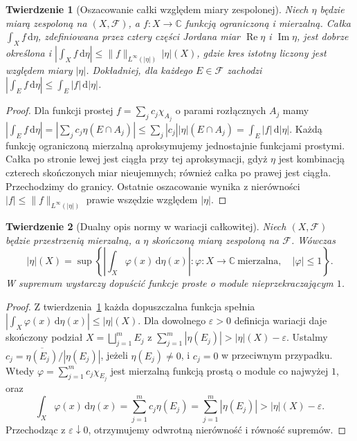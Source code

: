 \documentclass[11pt,a4paper,oneside]{book}
\numberwithin{equation}{chapter}
\theoremstyle{plain}
\newtheorem{twierdzenie}{Twierdzenie}[chapter]
\theoremstyle{definition}
\theoremstyle{remark}
\begin{document}
\begin{twierdzenie}[Oszacowanie całki względem miary zespolonej]
\label{thm:bounded-integral-complex-16}
Niech $\eta$ będzie miarą zespoloną na $(X,\mathcal F)$,
a $f:X\to\mathbb C$ funkcją ograniczoną i mierzalną.
Całka $\int_Xf\,\mathrm d\eta$, zdefiniowana przez
cztery części Jordana miar
$\operatorname{Re}\eta$ i $\operatorname{Im}\eta$, jest dobrze
określona i
$|\int_Xf\,\mathrm d\eta|\le\|f\|_{L^\infty(|\eta|)}\,|\eta|(X)$,
gdzie kres istotny liczony jest względem miary $|\eta|$.
Dokładniej, dla każdego $E\in\mathcal F$ zachodzi
$|\int_Ef\,\mathrm d\eta|\le\int_E|f|\,\mathrm d|\eta|$.
\end{twierdzenie}
\begin{proof}
Dla funkcji prostej $f=\sum_jc_j\chi_{A_j}$
o parami rozłącznych $A_j$ mamy
$|\int_Ef\,\mathrm d\eta|
=|\sum_jc_j\eta(E\cap A_j)|
\le\sum_j|c_j||\eta|(E\cap A_j)
=\int_E|f|\,\mathrm d|\eta|$.
Każdą funkcję ograniczoną mierzalną aproksymujemy
jednostajnie funkcjami prostymi. Całka po stronie
lewej jest ciągła przy tej aproksymacji, gdyż
$\eta$ jest kombinacją czterech skończonych miar
nieujemnych; również całka po prawej jest ciągła.
Przechodzimy do granicy. Ostatnie oszacowanie wynika z nierówności
$|f|\le\|f\|_{L^\infty(|\eta|)}$ prawie wszędzie
względem $|\eta|$.
\end{proof}

\begin{twierdzenie}[Dualny opis normy w wariacji całkowitej]
\label{thm:tv-dual-tests-16}
Niech $(X,\mathcal F)$ będzie przestrzenią mierzalną,
a $\eta$ skończoną miarą zespoloną na $\mathcal F$.
Wówczas
\begin{equation}\label{eq:tv-dual-tests-16}
 |\eta|(X)=\sup\left\{\left|\int_X \varphi(x)\,\mathrm d\eta(x)\right|:
 \varphi:X\to\mathbb C\ \text{mierzalna},\quad |\varphi|\le1\right\}.
\end{equation}
W supremum wystarczy dopuścić funkcje proste o module
nieprzekraczającym $1$.
\end{twierdzenie}
\begin{proof}
Z twierdzenia~\ref{thm:bounded-integral-complex-16}
każda dopuszczalna funkcja spełnia
$|\int_X\varphi(x)\,\mathrm d\eta(x)|\le|\eta|(X)$.
Dla dowolnego $\varepsilon>0$ definicja wariacji daje
skończony podział $X=\bigsqcup_{j=1}^mE_j$ z
$\sum_{j=1}^m|\eta(E_j)|>|\eta|(X)-\varepsilon$.
Ustalmy
$c_j=\overline{\eta(E_j)}/|\eta(E_j)|$, jeżeli
$\eta(E_j)\neq0$, i $c_j=0$ w przeciwnym przypadku.
Wtedy $\varphi=\sum_{j=1}^mc_j\chi_{E_j}$ jest
mierzalną funkcją prostą o module co najwyżej $1$, oraz
\[
 \int_X\varphi(x)\,\mathrm d\eta(x)
 =\sum_{j=1}^mc_j\eta(E_j)
 =\sum_{j=1}^m|\eta(E_j)|>|\eta|(X)-\varepsilon.
\]
Przechodząc z $\varepsilon\downarrow0$, otrzymujemy
odwrotną nierówność i równość supremów.
\end{proof}
\end{document}
